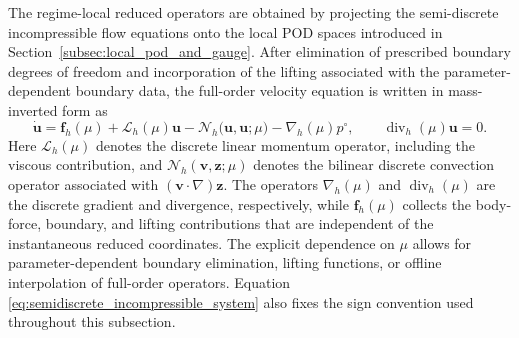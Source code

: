 The regime-local reduced operators are obtained by projecting the
semi-discrete incompressible flow equations onto the local POD spaces
introduced in Section~\ref{subsec:local_pod_and_gauge}.  After elimination of
prescribed boundary degrees of freedom and incorporation of the lifting
associated with the parameter-dependent boundary data, the full-order
velocity equation is written in mass-inverted form as
\begin{equation}
  \dot{\boldsymbol{u}}
  =
  \boldsymbol{f}_{h}(\mu)
  +\mathcal{L}_{h}(\mu)\boldsymbol{u}
  -\mathcal{N}_{h}
   \bigl(\boldsymbol{u},\boldsymbol{u};\mu\bigr)
  -\nabla_{h}(\mu)p^{\circ},
  \qquad
  \operatorname{div}_{h}(\mu)\boldsymbol{u}=0.
  \label{eq:semidiscrete_incompressible_system}
\end{equation}
Here $\mathcal{L}_{h}(\mu)$ denotes the discrete linear momentum operator,
including the viscous contribution, and
$\mathcal{N}_{h}(\boldsymbol{v},\boldsymbol{z};\mu)$ denotes the bilinear
discrete convection operator associated with
$(\boldsymbol{v}\cdot\nabla)\boldsymbol{z}$.  The operators
$\nabla_h(\mu)$ and $\operatorname{div}_h(\mu)$ are the discrete gradient
and divergence, respectively, while $\boldsymbol{f}_{h}(\mu)$ collects the
body-force, boundary, and lifting contributions that are independent of the
instantaneous reduced coordinates.  The explicit dependence on $\mu$
allows for parameter-dependent boundary elimination, lifting functions, or
offline interpolation of full-order operators.  Equation
\eqref{eq:semidiscrete_incompressible_system} also fixes the sign convention
used throughout this subsection.

